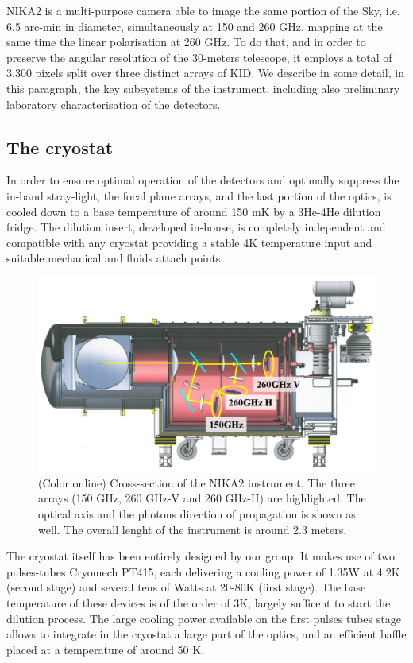 \documentclass[]{aa} %
\begin{document}
NIKA2 is a multi-purpose camera able to image the same portion of the Sky, i.e. 6.5 arc-min in diameter, simultaneously at 150 and 260 GHz, mapping at the same time the linear polarisation  at 260 GHz. To do that, and in order to preserve the angular resolution of the 30-meters telescope, it employs a total of 3,300 pixels split over three distinct arrays of KID. We describe in some detail, in this paragraph, the key subsystems of the instrument, including also preliminary laboratory characterisation of the detectors. 


 \subsection{The cryostat}

In order to ensure optimal operation of the detectors and optimally suppress the in-band stray-light, the focal plane arrays, and the last portion of the optics, is cooled down to a base temperature of around 150 mK by a 3He-4He dilution fridge. The dilution insert, developed in-house, is completely independent and compatible with any cryostat providing a stable 4K temperature input and suitable mechanical and fluids attach points. 

\begin{figure}[h]
   \centering
   \includegraphics[width=.95\linewidth]{Fig1_cryo.png}
      \caption{(Color online) Cross-section of the NIKA2 instrument. The three arrays (150 GHz, 260 GHz-V and 260 GHz-H) are highlighted. The optical axis and the photons direction of propagation is shown as well. The overall lenght of the instrument is around 2.3 meters.}
         \label{Cryostat}
\end{figure}

The cryostat itself has been entirely designed by our group. It makes use of two pulses-tubes Cryomech PT415, each delivering a cooling power of 1.35W at 4.2K (second stage) and several tens of Watts at 20-80K (first stage). The base temperature of these devices is of the order of 3K, largely sufficent to start the dilution process. The large cooling power available on the first pulses tubes stage allows to integrate in the cryostat a large part of the optics, and an efficient baffle placed at a temperature of around 50 K.
\end{document}
